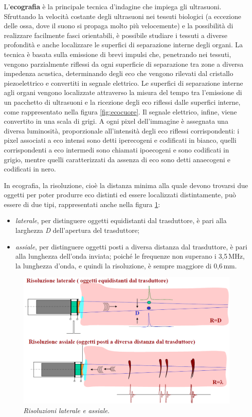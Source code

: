 \documentclass{report}
\newcommand{\figref}[1]{figura \ref{#1}}
\numberwithin{equation}{section}
\numberwithin{figure}{section}
\begin{document}
L'\textbf{ecografia} è la principale tecnica d'indagine che impiega gli ultrasuoni. Sfruttando la velocità costante degli ultrasuoni nei tessuti biologici (a eccezione delle ossa, dove il suono si propaga molto più velocemente) e la possibilità di realizzare facilmente fasci orientabili, è possibile studiare i tessuti a diverse profondità e anche localizzare le superfici di separazione interne degli organi. La tecnica è basata sulla emissione di brevi impulsi che, penetrando nei tessuti, vengono parzialmente riflessi da ogni superficie di separazione tra zone a diversa impedenza acustica, determinando degli eco che vengono rilevati dal cristallo piezoelettrico e convertiti in segnale elettrico. Le superfici di separazione interne agli organi vengono localizzate attraverso la misura del tempo tra l’emissione di un pacchetto di ultrasuoni e la ricezione degli eco riflessi dalle superfici interne, come rappresentato nella \figref{fig:ecocuore}. Il segnale elettrico, infine, viene convertito in una scala di grigi. A ogni pixel dell'immagine è assegnata una diversa luminosità, proporzionale all'intensità degli eco riflessi corrispondenti: i pixel associati a eco intensi sono detti iperecogeni e codificati in bianco, quelli corrispondenti a eco intermedi sono chiamati ipoecogeni e sono codificati in grigio, mentre quelli caratterizzati da assenza di eco sono detti anaecogeni e codificati in nero.

In ecografia, la risoluzione, cioè la distanza minima alla quale devono trovarsi due oggetti per poter produrre eco distinti ed essere localizzati distintamente, può essere di due tipi, rappresentati anche nella \figref{fig:riso}:
\begin{itemize}[label=$-$]
    \item \emph{laterale}, per distinguere oggetti equidistanti dal trasduttore, è pari alla larghezza \textit{D} dell'apertura del trasduttore;
    \item \emph{assiale}, per distinguere oggetti posti a diversa distanza dal trasduttore, è pari alla lunghezza dell'onda inviata; poiché le frequenze non superano i 3,5\,MHz, la lunghezza d'onda, e quindi la risoluzione, è sempre maggiore di 0,6\,mm.
\end{itemize}

\begin{figure}[htp]
\centering
\includegraphics[scale=0.7]{immagini/riso.png}
\caption{\label{fig:riso} \textit{Risoluzioni laterale e assiale}.}
\end{figure}
\end{document}
